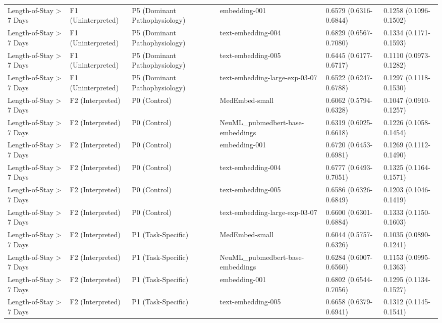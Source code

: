 \begin{tabular}{llllll}
Length-of-Stay \textgreater{} 7 Days & F1 (Uninterpreted) & P5 (Dominant Pathophysiology) & embedding-001 & 0.6579 (0.6316-0.6844) & 0.1258 (0.1096-0.1502) \\
Length-of-Stay \textgreater{} 7 Days & F1 (Uninterpreted) & P5 (Dominant Pathophysiology) & text-embedding-004 & 0.6829 (0.6567-0.7080) & 0.1334 (0.1171-0.1593) \\
Length-of-Stay \textgreater{} 7 Days & F1 (Uninterpreted) & P5 (Dominant Pathophysiology) & text-embedding-005 & 0.6445 (0.6177-0.6717) & 0.1110 (0.0973-0.1282) \\
Length-of-Stay \textgreater{} 7 Days & F1 (Uninterpreted) & P5 (Dominant Pathophysiology) & text-embedding-large-exp-03-07 & 0.6522 (0.6247-0.6788) & 0.1297 (0.1118-0.1530) \\
Length-of-Stay \textgreater{} 7 Days & F2 (Interpreted) & P0 (Control) & MedEmbed-small & 0.6062 (0.5794-0.6328) & 0.1047 (0.0910-0.1257) \\
Length-of-Stay \textgreater{} 7 Days & F2 (Interpreted) & P0 (Control) & NeuML\_pubmedbert-base-embeddings & 0.6319 (0.6025-0.6618) & 0.1226 (0.1058-0.1454) \\
Length-of-Stay \textgreater{} 7 Days & F2 (Interpreted) & P0 (Control) & embedding-001 & 0.6720 (0.6453-0.6981) & 0.1269 (0.1112-0.1490) \\
Length-of-Stay \textgreater{} 7 Days & F2 (Interpreted) & P0 (Control) & text-embedding-004 & 0.6777 (0.6493-0.7051) & 0.1325 (0.1164-0.1571) \\
Length-of-Stay \textgreater{} 7 Days & F2 (Interpreted) & P0 (Control) & text-embedding-005 & 0.6586 (0.6326-0.6849) & 0.1203 (0.1046-0.1419) \\
Length-of-Stay \textgreater{} 7 Days & F2 (Interpreted) & P0 (Control) & text-embedding-large-exp-03-07 & 0.6600 (0.6301-0.6884) & 0.1333 (0.1150-0.1603) \\
Length-of-Stay \textgreater{} 7 Days & F2 (Interpreted) & P1 (Task-Specific) & MedEmbed-small & 0.6044 (0.5757-0.6326) & 0.1035 (0.0890-0.1241) \\
Length-of-Stay \textgreater{} 7 Days & F2 (Interpreted) & P1 (Task-Specific) & NeuML\_pubmedbert-base-embeddings & 0.6284 (0.6007-0.6560) & 0.1153 (0.0995-0.1363) \\
Length-of-Stay \textgreater{} 7 Days & F2 (Interpreted) & P1 (Task-Specific) & embedding-001 & 0.6802 (0.6544-0.7056) & 0.1295 (0.1134-0.1527) \\
Length-of-Stay \textgreater{} 7 Days & F2 (Interpreted) & P1 (Task-Specific) & text-embedding-005 & 0.6658 (0.6379-0.6941) & 0.1312 (0.1145-0.1541) \\

\end{tabular}
